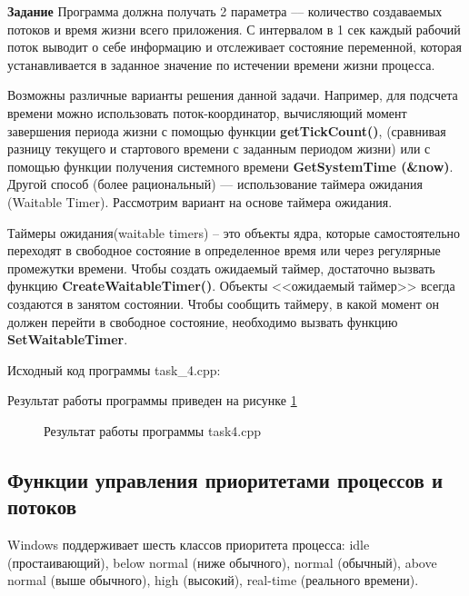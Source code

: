 \documentclass[a4paper]{article}
\begin{document}
	\textbf{Задание} Программа должна получать 2 параметра --– количество создаваемых потоков и время жизни всего приложения. С интервалом в 1 сек каждый рабочий поток выводит о себе информацию и отслеживает состояние переменной, которая устанавливается в заданное значение по истечении времени жизни процесса.
	
	Возможны различные варианты решения данной задачи. Например, для подсчета времени можно использовать поток-координатор, вычисляющий момент завершения периода жизни с помощью функции \textbf{getTickCount()}, (сравнивая разницу текущего и стартового времени с заданным периодом жизни) или с помощью функции получения системного времени \textbf{GetSystemTime (\&now)}. Другой способ (более рациональный) --- использование таймера ожидания (Waitable Timer).
Рассмотрим вариант на основе таймера ожидания.

	Таймеры ожидания(waitable timers) – это объекты ядра, которые самостоятельно переходят в свободное состояние в определенное время или через регулярные промежутки времени. Чтобы создать ожидаемый таймер, достаточно вызвать функцию \textbf{CreateWaitableTimer()}. Объекты <<ожидаемый таймер>> всегда создаются в занятом состоянии. Чтобы сообщить таймеру, в какой момент он должен перейти в свободное состояние, необходимо вызвать функцию \textbf{SetWaitableTimer}.
	
	Исходный код программы task\_4.cpp:
	
	
	Результат работы программы приведен на рисунке \ref{img:task4}
	\begin{figure}[h!]
		\caption{Результат работы программы task4.cpp}
		\label{img:task4}
	\end{figure}
	
	\subsection{Функции управления приоритетами процессов и потоков}
	Windows поддерживает шесть классов приоритета процесса: idle (простаивающий), below normal (ниже обычного), normal (обычный), above normal (выше обычного), high (высокий), real-time (реального времени).
	
\end{document}
